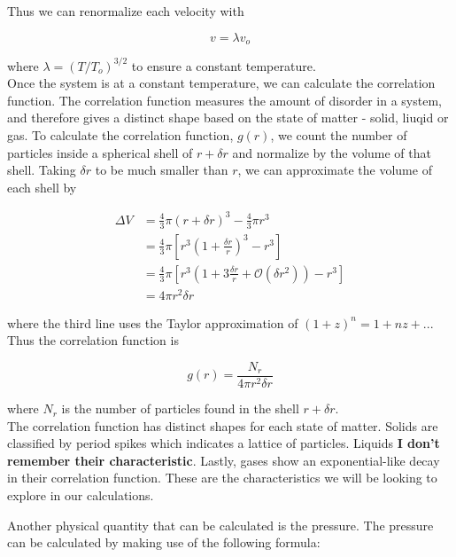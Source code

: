 \documentclass{article}
\begin{document}
\begin{multicols}{2}
\noindent Thus we can renormalize each velocity with 

\begin{equation}
v = \lambda v_o
\end{equation}

\noindent where $\lambda = (T/T_o)^{3/2}$ to ensure a constant temperature.  \\

Once the system is at a constant temperature, we can calculate the correlation function.  The correlation function measures the amount of disorder in a system, and therefore gives a distinct shape based on the state of matter - solid, liuqid or gas.  To calculate the correlation function, $g(r)$, we count the number of particles inside a spherical shell of $r + \delta r$ and normalize by the volume of that shell.  Taking $\delta r$ to be much smaller than $r$, we can approximate the volume of each shell by

\begin{equation}
\begin{split}
\Delta V & = \frac{4}{3} \pi (r+\delta r)^3 - \frac{4}{3} \pi r^3 \\
& = \frac{4}{3} \pi \left [ r^3 \left (1+\frac{\delta r}{r} \right )^3 - r^3 \right ] \\
& = \frac{4}{3} \pi \left [ r^3 \left ( 1 + 3\frac{\delta r}{r} + \mathcal{O} (\delta r ^2) \right ) - r^3 \right ] \\
& = 4 \pi r^2 \delta r
\end{split}
\end{equation}

\noindent where the third line uses the Taylor approximation of $(1+z)^n = 1 + nz+ ...$  Thus the correlation function is

\begin{equation}
g(r) = \frac{N_r}{4 \pi r^2 \delta r}
\end{equation}

\noindent where $N_r$ is the number of particles found in the shell $r + \delta r$.  \\

The correlation function has distinct shapes for each state of matter.  Solids are classified by period spikes which indicates a lattice of particles.  Liquids \textbf{I don't remember their characteristic}.  Lastly, gases show an exponential-like decay in their correlation function.  These are the characteristics we will be looking to explore in our calculations.

\noindent Another physical quantity that can be calculated is the pressure. The pressure can be calculated by making use of the following formula:


\end{multicols}
\end{document}
